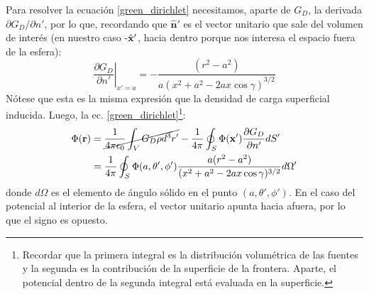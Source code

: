 \documentclass[]{article}
\numberwithin{equation}{section}
\begin{document}
Para resolver la ecuación \ref{green_dirichlet} necesitamos, aparte de \(G_D\), la derivada \({\partial G_D}/{\partial n'}\), por lo que, recordando que \(\hat{\mathbf{n}}'\) es el vector unitario que sale del volumen de interés (en nuestro caso -\(\hat{\mathbf{x}}'\), hacia dentro porque nos interesa el espacio fuera de la esfera):
\begin{equation*}
	\left. \frac{\partial G_D}{\partial n'} \right|_{x'=a}= - \frac{(r^2 - a^2)}{a(x^2 + a^2 - 2 a x \cos \gamma)^{3/2}} 
\end{equation*}
Nótese que esta es la misma expresión que la densidad de carga superficial inducida. Luego, la ec. \ref{green_dirichlet}\footnote{Recordar que la primera integral es la distribución volumétrica de las fuentes y la segunda es la contribución de la superficie de la frontera. Aparte, el potencial dentro de la segunda integral está evaluada en la superficie.}:
\begin{align}
	\Phi(\mathbf{r}) &= \cancel{\frac{1}{4\pi\epsilon_{0}}\int_{V}G_D\rho d^3r'} - \frac{1}{4\pi}\oint_{S}\Phi(\mathbf{x}')\frac{\partial G_D}{\partial n'} dS'\nonumber\\
	&= \frac{1}{4\pi}\oint_{S}\Phi(a,\theta',\phi')\frac{a(r^2 - a^2)}{(x^2 + a^2 - 2 a x \cos \gamma)^{3/2}} d\Omega'\label{pot_green_esf}
\end{align}
donde \(d\Omega\) es el elemento de ángulo sólido en el punto \((a,\theta',\phi')\). En el caso del potencial al interior de la esfera, el vector unitario apunta hacia afuera, por lo que el signo es opuesto.
\end{document}
